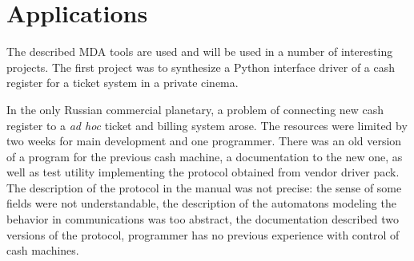 \documentclass[runningheads]{llncs}
\begin{document}


\section{Applications}
\label{sec:app}

The described MDA tools are used and will be used in a number of interesting projects.  The first project was to synthesize a Python interface driver of a cash register for a ticket system in a private cinema.

In the only Russian commercial planetary, a problem of connecting new cash register to a \emph{ad hoc} ticket and billing system arose.  The resources were limited by two weeks for main development and one programmer.  There was an old version of a program for the previous cash machine, a documentation to the new one, as well as test utility implementing the protocol obtained from vendor driver pack.  The description of the protocol in the manual was not precise: the sense of some fields were not understandable, the description of the automatons modeling the behavior in communications was too abstract, the documentation described two versions of the protocol, programmer has no previous experience with control of cash machines.
\end{document}
